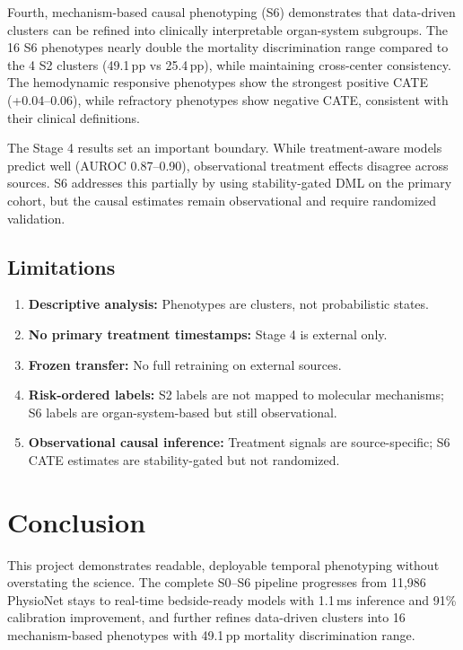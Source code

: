 \documentclass[conference,a4paper]{IEEEtran}
\begin{document}
Fourth, mechanism-based causal phenotyping (S6) demonstrates that data-driven clusters can be refined into clinically interpretable organ-system subgroups. The 16 S6 phenotypes nearly double the mortality discrimination range compared to the 4 S2 clusters (49.1\,pp vs 25.4\,pp), while maintaining cross-center consistency. The hemodynamic responsive phenotypes show the strongest positive CATE (+0.04--0.06), while refractory phenotypes show negative CATE, consistent with their clinical definitions.

The Stage 4 results set an important boundary. While treatment-aware models predict well (AUROC 0.87--0.90), observational treatment effects disagree across sources. S6 addresses this partially by using stability-gated DML on the primary cohort, but the causal estimates remain observational and require randomized validation.

\subsection{Limitations}

\begin{enumerate}[nosep]
  \item \textbf{Descriptive analysis:} Phenotypes are clusters, not probabilistic states.
  \item \textbf{No primary treatment timestamps:} Stage 4 is external only.
  \item \textbf{Frozen transfer:} No full retraining on external sources.
  \item \textbf{Risk-ordered labels:} S2 labels are not mapped to molecular mechanisms; S6 labels are organ-system-based but still observational.
  \item \textbf{Observational causal inference:} Treatment signals are source-specific; S6 CATE estimates are stability-gated but not randomized.
\end{enumerate}

\section{Conclusion}

This project demonstrates readable, deployable temporal phenotyping without overstating the science. The complete S0--S6 pipeline progresses from 11,986 PhysioNet stays to real-time bedside-ready models with 1.1\,ms inference and 91\% calibration improvement, and further refines data-driven clusters into 16 mechanism-based phenotypes with 49.1\,pp mortality discrimination range.
\end{document}
